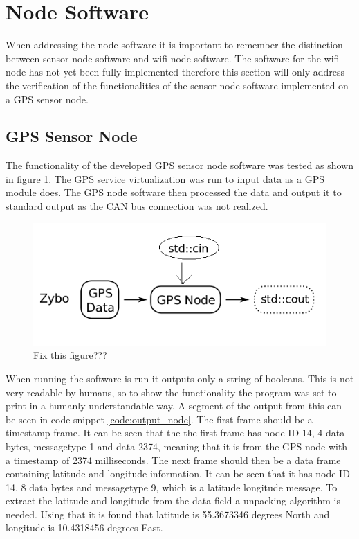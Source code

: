 \section{Node Software}
\label{sec:node_software}
When addressing the node software it is important to remember the distinction between sensor node software and wifi node software.
The software for the wifi node has not yet been fully implemented therefore this section will only address the verification of the functionalities of the sensor node software implemented on a GPS sensor node.

\subsection{GPS Sensor Node}
The functionality of the developed GPS sensor node software was tested as shown in figure \ref{fig:sensor_gps_veri}.
The GPS service virtualization was run to input data as a GPS module does. 
The GPS node software then processed the data and output it to standard output as the CAN bus connection was not realized.

\begin{figure}[h]
	\centering
	\includegraphics[width = 0.6\linewidth]{graphics/sensor_gps_veri}
	\caption{Fix this figure???}
	\label{fig:sensor_gps_veri}
\end{figure}

When running the software is run it outputs only a string of booleans. 
This is not very readable by humans, so to show the functionality the program was set to print in a humanly understandable way.
A segment of the output from this can be seen in code snippet \ref{code:output_node}.
The first frame should be a timestamp frame. 
It can be seen that the the first frame has node ID 14, 4 data bytes, messagetype 1 and data 2374, meaning that it is from the GPS node with a timestamp of 2374 milliseconds.
The next frame should then be a data frame containing latitude and longitude information.
It can be seen that it has node ID 14, 8 data bytes and messagetype 9, which is a latitude longitude message.
To extract the latitude and longitude from the data field a unpacking algorithm is needed.
Using that it is found that latitude is 55.3673346 degrees North and longitude is 10.4318456 degrees East.

